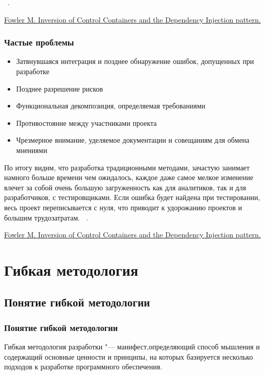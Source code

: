 \documentclass{../industrial-development}
\begin{document}
\lecturenotes

~\cite{Fowler}.

\begin{thebibliography}{99}
 \href{https://project.dovidnyk.info/index.php/programnye-proekty/upravlenieproektamiposozdaniyuprogrammnogoobespecheniya/66-tradicionnoe_upravlenie_razrabotkoj_po}{Fowler M. Inversion of Control Containers and the Dependency Injection pattern.}
\end{thebibliography}

\begin{frame} \frametitle{Частые проблемы}
	\begin{itemize}
	  \item Затянувшаяся интеграция и позднее обнаружение ошибок, допущенных при разработке 
		\item Позднее разрешение рисков 
		\item Функциональная декомпозиция, определяемая требованиями 
		\item Противостояние между участниками проекта 
		\item Чрезмерное внимание, уделяемое документации и совещаниям для обмена мнениями 
	\end{itemize}
\end{frame}

\lecturenotes
По итогу видим, что разработка традиционными методами, зачастую занимает намного больше времени чем ожидалось, каждое даже самое мелкое изменение влечет за собой очень большую загруженность как для аналитиков, так и для разработчиков, с тестировщиками. Если ошибка будет найдена при тестировании, весь проект переписывается с нуля, что приводит к удорожанию проектов и большим трудозатратам.   
~\cite{Fowler}.

\begin{thebibliography}{99}
 \href{https://project.dovidnyk.info/index.php/programnye-proekty/upravlenieproektamiposozdaniyuprogrammnogoobespecheniya/66-tradicionnoe_upravlenie_razrabotkoj_po}{Fowler M. Inversion of Control Containers and the Dependency Injection pattern.}
\end{thebibliography}


\section{Гибкая методология}
\subsection{Понятие гибкой методологии}
\begin{frame} \frametitle{Понятие гибкой методологии}
  \begin{block}{}
   \alert{Гибкая методология разработки} "--- манифест,определяющий способ мышления и содержащий основные ценности и принципы, на которых базируется несколько подходов к разработке программного обеспечения.
  \end{block}
\end{frame}
\end{document}
